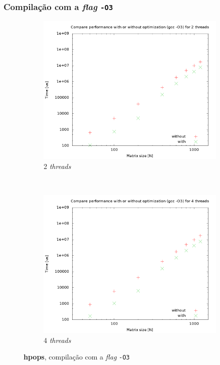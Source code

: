 \documentclass[a4paper, 12pt]{article}
\begin{document}
\subsubsection{Compilação com a \textit{flag} \texttt{-O3}}
\begin{figure}[H]
    \centering
    \begin{subfigure}[H]{0.5\textwidth}
        \includegraphics[width=\textwidth]{hpops_cmp_optimization-2t}
        \caption{2 \textit{threads}}
        \label{fig:hpops_o3_2t}
    \end{subfigure}%
    ~ %
    \begin{subfigure}[H]{0.5\textwidth}
        \includegraphics[width=\textwidth]{hpops_cmp_optimization-4t}
        \caption{4 \textit{threads}}
        \label{fig:hpops_o3_4t}
    \end{subfigure}
    \caption{\textbf{hpops}, compilação com a \textit{flag} \texttt{-O3}}\label{fig:animals}
\end{figure}
\end{document}
